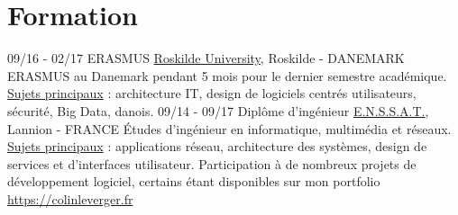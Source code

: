 \documentclass[]{friggeri-cv}
\begin{document}
\section{Formation}
\begin{entrylist}
  \entry
    {09/16 - 02/17}
    {ERASMUS}
    {\href{http://www.ruc.dk/en/}{Roskilde University}, Roskilde - DANEMARK}
    {
    ERASMUS au Danemark pendant 5 mois pour le dernier semestre académique.
    \underline {Sujets principaux} : architecture IT, design de logiciels centrés utilisateurs, sécurité, Big Data, danois.
    }
  \entry
    {09/14 - 09/17}
    {Diplôme d'ingénieur}
    {\href{http://www.enssat.fr}{E.N.S.S.A.T.}, Lannion - FRANCE}
    {Études d’ingénieur en informatique, multimédia et réseaux. \underline {Sujets principaux} : applications réseau, architecture des systèmes, design de services et d’interfaces utilisateur. Participation à de nombreux projets de développement logiciel, certains étant disponibles sur mon portfolio \href {https://colinleverger.fr}{https://colinleverger.fr}
}
\vspace{-1.2em}  
\end{entrylist}

\vspace{-1.1em}

\end{document}
